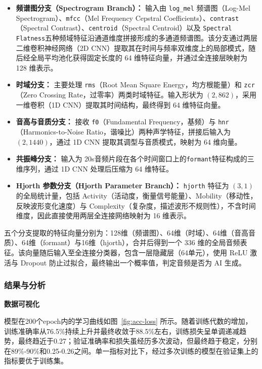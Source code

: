 \documentclass[a4paper,12pt]{article}
\begin{document}
\begin{itemize}
 
  \item \textbf{频谱图分支（Spectrogram Branch）：} 输入由 \texttt{log\_mel} 频谱图（Log-Mel Spectrogram）、\texttt{mfcc}（Mel Frequency Cepstral Coefficients）、\texttt{contrast}（Spectral Contrast）、\texttt{centroid}（Spectral Centroid）以及 \texttt{Spectral Flatness}五种频域特征沿通道维度拼接形成的多通道频谱图。该分支通过两层二维卷积神经网络（2D CNN）提取其在时间与频率双维度上的局部模式，随后经全局平均池化获得固定长度的 64 维特征向量，并通过全连接层映射为 128 维表示。

    \item \textbf{时域分支：} 主要处理 \texttt{rms}（Root Mean Square Energy，均方根能量）和 \texttt{zcr}（Zero Crossing Rate，过零率）两类时域特征。输入形状为 $(2, 862)$，采用一维卷积（1D CNN）提取其时间结构，最终得到 64 维特征向量。
      
    \item \textbf{音高与音质分支：} 接收 \texttt{f0}（Fundamental Frequency，基频）与 \texttt{hnr}（Harmonics-to-Noise Ratio，谐噪比）两种声学特征，拼接后输入为 $(2, 1440)$，通过 1D CNN 提取其调型与音质模式，映射为 64 维向量。
      
    \item \textbf{共振峰分支：} 输入为 20s音频片段在各个时间窗口上的\texttt{formant}特征构成的三维序列，通过 1D CNN 处理后压缩为 64 维特征。
      
    \item \textbf{Hjorth 参数分支（Hjorth Parameter Branch）：} \texttt{hjorth} 特征为 $(3,1)$ 的全局统计量，包括 Activity（活动度，衡量信号能量）、Mobility（移动性，反映波形变化速度）与 Complexity（复杂度，描述波形不规则性），不含时间维度，因此直接使用两层全连接网络映射为 16 维表示。

\end{itemize}

五个分支提取的特征向量分别为：128维（频谱图）、64维（时域）、64维（音高音质）、64维（formant）与16维（hjorth），合并后得到一个 $336$ 维的全局音频表征。该向量随后输入至全连接分类器，包含一层隐藏层（64单元），使用 ReLU 激活与 Dropout 防止过拟合，最终输出一个概率值，判定音频是否为 AI 生成。



\subsubsection{结果与分析}
\noindent\textbf{数据可视化}\par
模型在200个epoch内的学习曲线如图~\ref{fig:acc-loss} 所示。随着训练代数的增加，训练准确率从76.5\%持续上升并最终收敛于88.5\%左右，训练损失呈单调递减趋势，最终趋近于0.27；验证准确率和损失虽经历多次波动，但最终趋于稳定，分别在89\%-90\%和0.25-0.26之间。单一指标对比下，经过多次训练的模型在验证集上的指标要优于训练集。
\end{document}
